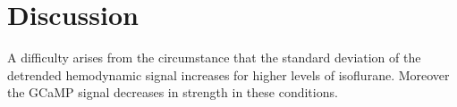 
\chapter{Discussion} %

\label{Chapter5} %


A difficulty arises from the circumstance that the standard deviation of the detrended hemodynamic signal increases for higher levels of isoflurane. Moreover the GCaMP signal decreases in strength in these conditions.
